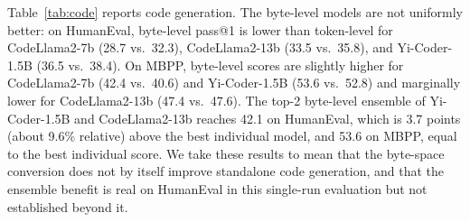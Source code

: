 \documentclass{article} %
\begin{document}
\begin{table}[t]
\caption{Knowledge and reasoning accuracy (\%) with token-level and byte-level probabilities. The top-2 ensemble averages byte-level distributions of the two best models on each task. ``N/A'' marks settings not reported in the logs. Best byte-level value per column in bold among non-voting rows where the comparison is meaningful.}
\label{tab:general}
\begin{center}
\end{center}
\end{table}

Table~\ref{tab:code} reports code generation. The byte-level models are not uniformly better: on HumanEval, byte-level pass@1 is lower than token-level for CodeLlama2-7b (28.7 vs.\ 32.3), CodeLlama2-13b (33.5 vs.\ 35.8), and Yi-Coder-1.5B (36.5 vs.\ 38.4). On MBPP, byte-level scores are slightly higher for CodeLlama2-7b (42.4 vs.\ 40.6) and Yi-Coder-1.5B (53.6 vs.\ 52.8) and marginally lower for CodeLlama2-13b (47.4 vs.\ 47.6). The top-2 byte-level ensemble of Yi-Coder-1.5B and CodeLlama2-13b reaches 42.1 on HumanEval, which is 3.7 points (about 9.6\% relative) above the best individual model, and 53.6 on MBPP, equal to the best individual score. We take these results to mean that the byte-space conversion does not by itself improve standalone code generation, and that the ensemble benefit is real on HumanEval in this single-run evaluation but not established beyond it.
\end{document}
